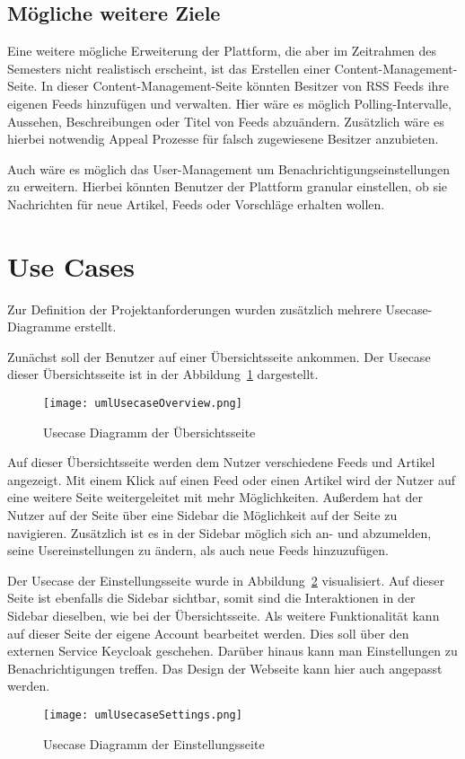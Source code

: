 \subsection{Mögliche weitere Ziele}
Eine weitere mögliche Erweiterung der Plattform, die aber im Zeitrahmen des Semesters nicht realistisch erscheint, ist das Erstellen einer Content-Management-Seite.
In dieser Content-Management-Seite könnten Besitzer von RSS Feeds ihre eigenen Feeds hinzufügen und verwalten.
Hier wäre es möglich Polling-Intervalle, Aussehen, Beschreibungen oder Titel von Feeds abzuändern.
Zusätzlich wäre es hierbei notwendig Appeal Prozesse für falsch zugewiesene Besitzer anzubieten.

Auch wäre es möglich das User-Management um Benachrichtigungseinstellungen zu erweitern. 
Hierbei könnten Benutzer der Plattform granular einstellen, ob sie Nachrichten für neue Artikel, Feeds oder Vorschläge erhalten wollen.

\section{Use Cases}
Zur Definition der Projektanforderungen wurden zusätzlich mehrere Usecase-Diagramme erstellt.

Zunächst soll der Benutzer auf einer Übersichtsseite ankommen.
Der Usecase dieser Übersichtsseite ist in der Abbildung~\ref{fig:usecaseOverview} dargestellt.
\begin{figure}
    \texttt{[image: umlUsecaseOverview.png]}
    \caption{Usecase Diagramm der Übersichtsseite}
    \label{fig:usecaseOverview}
\end{figure}
Auf dieser Übersichtsseite werden dem Nutzer verschiedene Feeds und Artikel angezeigt. Mit einem Klick auf einen Feed oder einen Artikel wird
der Nutzer auf eine weitere Seite weitergeleitet mit mehr Möglichkeiten. Außerdem hat der Nutzer auf der Seite über eine Sidebar die Möglichkeit
auf der Seite zu navigieren. Zusätzlich ist es in der Sidebar möglich  sich an- und abzumelden, seine Usereinstellungen zu ändern, als auch neue Feeds
hinzuzufügen. 

Der Usecase der Einstellungsseite wurde in Abbildung~\ref{fig:usecaseSettings} visualisiert.
Auf dieser Seite ist ebenfalls die Sidebar sichtbar, somit sind die Interaktionen in der Sidebar dieselben, wie
bei der Übersichtsseite. Als weitere Funktionalität kann auf dieser Seite der eigene Account bearbeitet werden.
Dies soll über den externen Service Keycloak geschehen. Darüber hinaus
kann man Einstellungen zu Benachrichtigungen treffen. Das Design der
Webseite kann hier auch angepasst werden.
\begin{figure}
    \texttt{[image: umlUsecaseSettings.png]}
    \caption{Usecase Diagramm der Einstellungsseite}
    \label{fig:usecaseSettings}
\end{figure}


